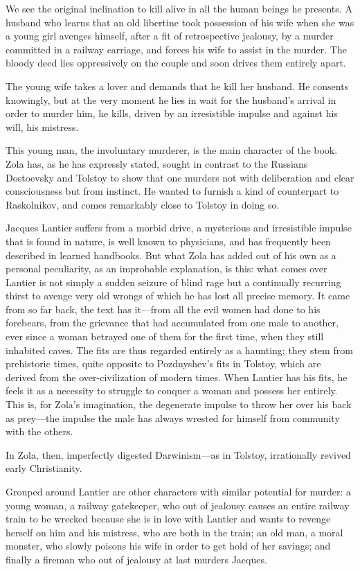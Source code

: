 \documentclass[12pt,a4paper]{article}
\begin{document}
We see the original inclination to kill alive in all the human beings
he presents. A husband who learns that an old libertine took possession
of his wife when she was a young girl avenges himself, after a fit of
retrospective jealousy, by a murder committed in a railway carriage,
and forces his wife to assist in the murder. The bloody deed lies
oppressively on the couple and soon drives them entirely apart.

The young wife takes a lover and demands that he kill her husband. He
consents knowingly, but at the very moment he lies in wait for the
husband's arrival in order to murder him, he kills, driven by an
irresistible impulse and against his will, his mistress.

This young man, the involuntary murderer, is the main character of
the book. Zola has, as he has expressly stated, sought in contrast to
the Russians Dostoevsky and Tolstoy to show that one murders not with
deliberation and clear consciousness but from instinct. He wanted to
furnish a kind of counterpart to Raskolnikov, and comes remarkably
close to Tolstoy in doing so.

Jacques Lantier suffers from a morbid drive, a mysterious and
irresistible impulse that is found in nature, is well known to
physicians, and has frequently been described in learned handbooks.
But what Zola has added out of his own as a personal peculiarity, as
an improbable explanation, is this: what comes over Lantier is not
simply a sudden seizure of blind rage but a continually recurring
thirst to avenge very old wrongs of which he has lost all precise
memory. It came from so far back, the text has it---from all the evil
women had done to his forebears, from the grievance that had
accumulated from one male to another, ever since a woman betrayed one
of them for the first time, when they still inhabited caves. The fits
are thus regarded entirely as a haunting; they stem from prehistoric
times, quite opposite to Pozdnyshev's fits in Tolstoy, which are
derived from the over-civilization of modern times. When Lantier has
his fits, he feels it as a necessity to struggle to conquer a woman
and possess her entirely. This is, for Zola's imagination, the
degenerate impulse to throw her over his back as prey---the impulse
the male has always wrested for himself from community with the others.

In Zola, then, imperfectly digested Darwinism---as in Tolstoy,
irrationally revived early Christianity.

Grouped around Lantier are other characters with similar potential for
murder: a young woman, a railway gatekeeper, who out of jealousy
causes an entire railway train to be wrecked because she is in love
with Lantier and wants to revenge herself on him and his mistress, who
are both in the train; an old man, a moral monster, who slowly
poisons his wife in order to get hold of her savings; and finally a
fireman who out of jealousy at last murders Jacques.
\end{document}

